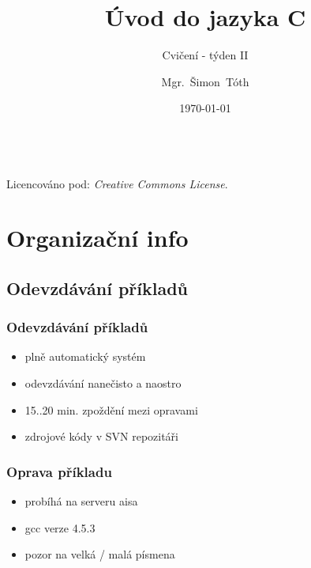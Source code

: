 

\title{Úvod do jazyka C}
\subtitle{Cvičení - týden II}
\author[]{Mgr.~Šimon~Tóth}
\date{\today}

\newcommand{\CcNote}[1]{%
        Licencováno pod: \textit{Creative Commons #1 3.0 License}.%
}


	\begin{frame}
		\titlepage
		\vfill
		\begin{center}
			\\
			{\tiny\CcNote{\CcLongnameByNcSa}}
			\vspace*{2ex}
		\end{center}
	\end{frame}

\section{Organizační info}


\subsection{Odevzdávání příkladů}

\begin{frame}
	\frametitle{Odevzdávání příkladů}
	\begin{itemize}
		\item{plně automatický systém}
		\item{odevzdávání nanečisto a naostro}
		\item{15..20 min. zpoždění mezi opravami}
		\item{zdrojové kódy v SVN repozitáři}
	\end{itemize}
\end{frame}

\begin{frame}
	\frametitle{Oprava příkladu}
	\begin{itemize}
		\item{probíhá na serveru aisa}
		\item{gcc verze 4.5.3}
		\item{pozor na velká / malá písmena}
	\end{itemize}
\end{frame}

